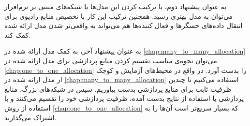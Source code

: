     به عنوان پیشنهاد دوم، با ترکیب کردن این مدل‌ها با شبکه‌های مبتنی بر نرم‌افزار می‌توان به مدل بهتری رسید.
    همچنین ترکیب این کار با تخصیص منابع رادیوی برای انتقال داده‌های حسگر‌ها و فعال کننده‌ها هم می‌تواند به واقعی‌تر شدن مدل ارائه شده کمک کند.

    به عنوان پیشنهاد آخر، به کمک مدل ارائه شده در \cref{chap:many_to_many_allocation} می‌توان نحوه‌ی مناسب تقسیم کردن منابع پردازشی برای مدل ارائه شده در \cref{chap:one_to_one_allocation} را بدست آورد.
    در واقع در محیط‌های آزمایش و کوچک از مدل ارائه شده در \cref{chap:many_to_many_allocation} استفاده می‌کنیم تا چندین ظرفیت ثابت برای منابع پردازشی بدست بیاوریم. سپس در شبکه‌های بزرگ، منابع پردازشی با استفاده از نتایج بدست آمده، ظرفیت پردازشی خود را تقسیم می‌کنند و با استفاده از روش \cref{chap:one_to_one_allocation} که بسیار سریع‌تر است آن‌ها را به اشتراک می‌گذارند.